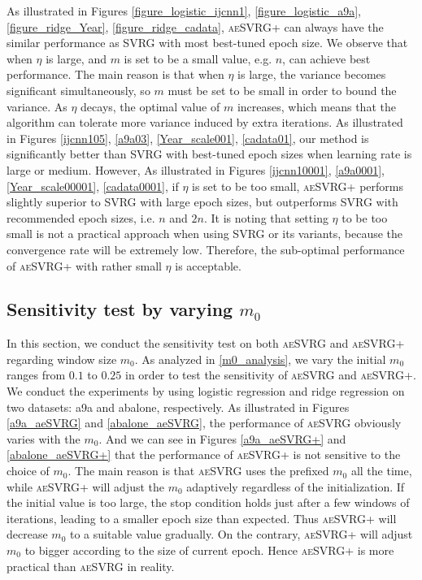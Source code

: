 \documentclass[conference]{IEEEtran}
\begin{document}
As illustrated in Figures \ref{figure_logistic_ijcnn1}, \ref{figure_logistic_a9a}, \ref{figure_ridge_Year}, \ref{figure_ridge_cadata},  \textsc{aeSVRG+} can always have the similar performance as SVRG with most best-tuned epoch size. We observe that when $\eta$ is large,  and $m$ is set to be a small value, e.g. $n$, can achieve best performance. The main reason is that when $\eta$ is large, the variance becomes significant simultaneously, so $m$ must be set to be small in order to bound the variance. As $\eta$ decays, the optimal value of $m$ increases, which means that the algorithm can tolerate more variance induced by extra iterations. As illustrated in Figures \ref{ijcnn105}, \ref{a9a03}, \ref{Year_scale001}, \ref{cadata01}, our method is significantly better than SVRG with best-tuned epoch sizes when learning rate is large or medium. However, As illustrated in Figures \ref{ijcnn10001}, \ref{a9a0001}, \ref{Year_scale00001}, \ref{cadata0001}, if $\eta$ is set to be too small, \textsc{aeSVRG+} performs slightly superior to  SVRG with large epoch sizes, but outperforms SVRG with recommended epoch sizes, i.e. $n$ and $2n$. It is noting that setting $\eta$ to be too small is not a practical approach when using SVRG or its variants, because the convergence rate will be extremely low. Therefore, the sub-optimal performance of \textsc{aeSVRG+} with rather small $\eta$ is acceptable.

 
\subsection{Sensitivity test by varying  $m_0$}
In this section, we conduct the sensitivity test on both \textsc{aeSVRG} and \textsc{aeSVRG+} regarding window size $m_0$. As analyzed in \ref{m0_analysis}, we vary the initial $m_0$ ranges from $0.1$ to $0.25$ in order to test the sensitivity of \textsc{aeSVRG} and \textsc{aeSVRG+}. We conduct the experiments by using logistic regression and ridge regression on two datasets: a9a and abalone, respectively. As illustrated in Figures \ref{a9a_aeSVRG} and \ref{abalone_aeSVRG}, the performance of \textsc{aeSVRG} obviously varies with the $m_0$. And we can see in Figures \ref{a9a_aeSVRG+} and \ref{abalone_aeSVRG+} that the performance of \textsc{aeSVRG+} is not sensitive to the choice of $m_0$. 
The main reason is that \textsc{aeSVRG} uses the prefixed $m_0$ all the time, while \textsc{aeSVRG+} will adjust the $m_0$ adaptively regardless of the initialization.
If the initial value is too large, the stop condition holds just after a few windows of iterations, leading to a smaller epoch size than expected.
Thus \textsc{aeSVRG+} will decrease $m_0$ to a suitable value gradually. On the contrary, \textsc{aeSVRG+} will adjust $m_0$ to bigger according to the size of current epoch.  
Hence \textsc{aeSVRG+} is more practical than \textsc{aeSVRG} in reality.
\end{document}
